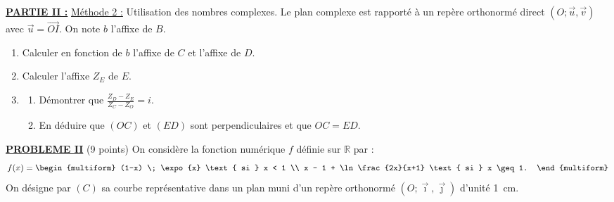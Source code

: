       \noindent \underline{\textbf{PARTIE II :}} \underline{M\'ethode 2 :} Utilisation des nombres complexes.
            Le plan complexe est rapport\'e \`a un rep\`ere orthonorm\'e direct $(O ; \vec{u} , \vec{v} )$ avec $\vec{u} = \overrightarrow{OI}$.
            On note $b$ l'affixe de $B$.
            \begin{enumerate}
                  \item Calculer en fonction de $b$ l'affixe de $C$ et l'affixe de $D$.
                  \item Calculer l'affixe $Z_E$ de $E$.
                  \item \begin{enumerate}
                              \item D\'emontrer que $\displaystyle{\frac{Z_D - Z_E}{Z_C - Z_O} = i}$.
                              \item En d\'eduire que $(OC)$ et $(ED)$ sont perpendiculaires et que $OC = ED$.
                        \end{enumerate}
            \end{enumerate}
%
\noindent \underline{\textsc{\textbf{PROBLEME II}}} (9 points) \newline
      On consid\`ere la fonction num\'erique $f$ d\'efinie sur $\mathbb{R}$ par :
      \[
      f(x) = \begin{multiform}
                   (1-x) \; \expo{x}  \text{ si }  x < 1 \\
                   x - 1 + \ln \frac{2x}{x+1}  \text{ si }  x \geq 1.
             \end{multiform}
      \]
      On d\'esigne par $(C)$ sa courbe repr\'esentative dans un plan muni d'un 
      rep\`ere orthonorm\'e $(O ; \vec{\imath} , \vec{\jmath})$ d'unit\'e 1~cm.
     
